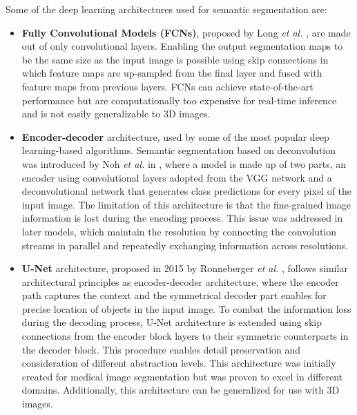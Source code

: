 \documentclass[a4paper,twoside,12pt]{book}
\begin{document}
Some of the deep learning architectures used for semantic segmentation are: %
\begin{itemize}
    \item \textbf{Fully Convolutional Models (FCNs)}, proposed by Long \textit{et al.} \cite{long2015fully}, are made out of only convolutional layers. Enabling the output segmentation maps to be the same size as the input image is possible using skip connections in which feature maps are up-sampled from the final layer and fused with feature maps from previous layers. FCNs can achieve state-of-the-art performance but are computationally too expensive for real-time inference and is not easily generalizable to 3D images.

    \item \textbf{Encoder-decoder} architecture, used by some of the most popular deep learning-based algorithms. Semantic segmentation based on deconvolution was introduced by Noh \textit{et al.} in \cite{noh2015learning}, where a model is made up of two parts, an encoder using convolutional layers adopted from the VGG network and a deconvolutional network that generates class predictions for every pixel of the input image. The limitation of this architecture is that the fine-grained image information is lost during the encoding process. This issue was addressed in later models, which maintain the resolution by connecting the convolution streams in parallel and repeatedly exchanging information across resolutions.

    \item \textbf{U-Net} architecture, proposed in 2015 by Ronneberger \textit{et al.} \cite{ronneberger2015u}, follows similar architectural principles as encoder-decoder architecture, where the encoder path captures the context and the symmetrical decoder part enables for precise location of objects in the input image. To combat the information loss during the decoding process, U-Net architecture is extended using skip connections from the encoder block layers to their symmetric counterparts in the decoder block. This procedure enables detail preservation and consideration of different abstraction levels. This architecture was initially created for medical image segmentation but was proven to excel in different domains. Additionally, this architecture can be generalized for use with 3D images.


\end{itemize}
\end{document}
